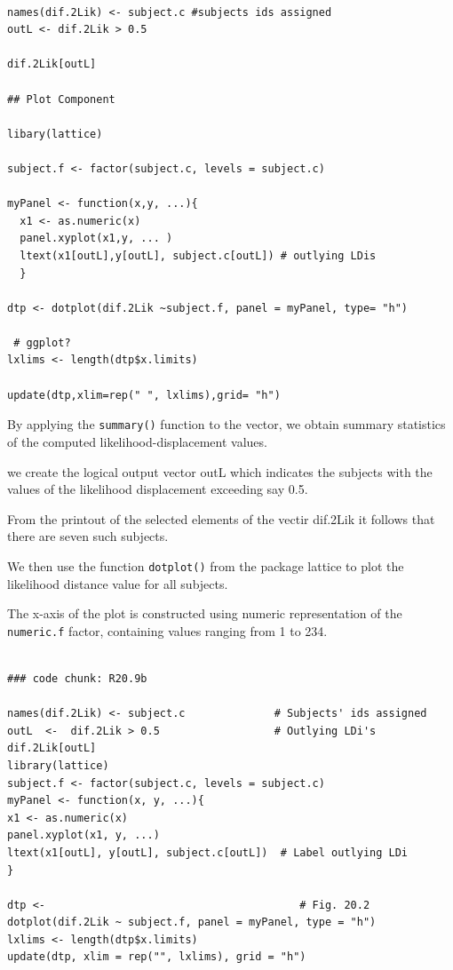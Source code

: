 \documentclass[a4paper,12pt]{article}
\begin{document}
\begin{framed}
\begin{verbatim}

names(dif.2Lik) <- subject.c #subjects ids assigned
outL <- dif.2Lik > 0.5

dif.2Lik[outL]

## Plot Component

libary(lattice)

subject.f <- factor(subject.c, levels = subject.c)

myPanel <- function(x,y, ...){
  x1 <- as.numeric(x)
  panel.xyplot(x1,y, ... )
  ltext(x1[outL],y[outL], subject.c[outL]) # outlying LDis
  }

dtp <- dotplot(dif.2Lik ~subject.f, panel = myPanel, type= "h")

 # ggplot?
lxlims <- length(dtp$x.limits)

update(dtp,xlim=rep(" ", lxlims),grid= "h")
\end{verbatim}
\end{framed}


By applying the \texttt{summary()} function to the vector, we obtain summary statistics of the computed likelihood-displacement values.

we create the logical output vector outL which indicates the subjects with the values of the 
likelihood displacement exceeding say 0.5.

From the printout of the selected elements of the vectir dif.2Lik it follows that there are
seven such subjects.


We then use the function \texttt{dotplot()} from the package lattice to plot the 
likelihood distance value for all subjects.

The x-axis of the plot is constructed using numeric representation of the \texttt{numeric.f} factor, containing values ranging from 1 to 234.

\newpage
\begin{framed}
\begin{verbatim}

### code chunk: R20.9b

names(dif.2Lik) <- subject.c              # Subjects' ids assigned
outL  <-  dif.2Lik > 0.5                  # Outlying LDi's
dif.2Lik[outL]
library(lattice)
subject.f <- factor(subject.c, levels = subject.c)
myPanel <- function(x, y, ...){
x1 <- as.numeric(x)
panel.xyplot(x1, y, ...)
ltext(x1[outL], y[outL], subject.c[outL])  # Label outlying LDi
}

dtp <-                                        # Fig. 20.2
dotplot(dif.2Lik ~ subject.f, panel = myPanel, type = "h")           
lxlims <- length(dtp$x.limits)         
update(dtp, xlim = rep("", lxlims), grid = "h") 






\end{verbatim}	
	
\end{framed}
\end{document}
